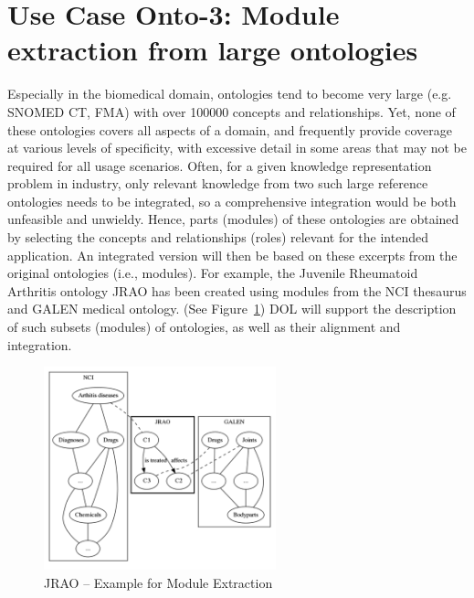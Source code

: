 \documentclass[10pt,%
\ifpretendfinal
final%
\else
draft%
\fi,
]{scrreprt}
\newcommand{\figurerefname}{Figure}
\newcommand{\fref}[1]{\figurerefname~\ref{#1}}
\begin{document}
\section{Use Case Onto-3: Module extraction from large ontologies}
Especially in the biomedical domain, ontologies tend to become very large (e.g. SNOMED CT, FMA) with over 100000 concepts and relationships. Yet, none of 
these ontologies covers all aspects of a domain, and frequently provide coverage at various levels of specificity, with excessive detail in some areas that may not 
be required for all usage scenarios. Often, for a given knowledge representation problem in industry, only relevant knowledge from two such large reference 
ontologies needs to be integrated, so a comprehensive integration would be both unfeasible and unwieldy. Hence, parts (modules) of these ontologies are obtained 
by selecting the concepts and relationships (roles) relevant for the intended application. An integrated version will then be based on these excerpts from the original 
ontologies (i.e., modules). For example, the Juvenile Rheumatoid Arthritis ontology JRAO has been created using modules from the NCI thesaurus and GALEN 
medical ontology. (See \fref{JRAO}) DOL will support the description of such subsets (modules) of ontologies, as well as their alignment and integration.


\begin{figure}[htbp]
\begin{center}
\includegraphics[width=0.6\textwidth]{useCaseOnto3.png}
\caption{JRAO  -- Example for Module Extraction}
\label{JRAO}
\end{center}
\end{figure}

 
\end{document}
